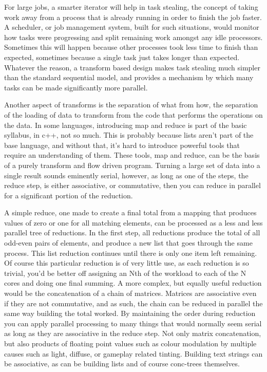 For large jobs, a smarter iterator will help in task stealing, the concept of
taking work away from a process that is already running in order to finish the
job faster. A scheduler, or job management system, built for such situations,
would monitor how tasks were progressing and split remaining work amongst any
idle processors. Sometimes this will happen because other processes took less
time to finish than expected, sometimes because a single task just takes longer
than expected. Whatever the reason, a transform based design makes task
stealing much simpler than the standard sequential model, and provides a
mechanism by which many tasks can be made significantly more parallel.

Another aspect of transforms is the separation of what from how, the separation
of the loading of data to transform from the code that performs the operations
on the data. In some languages, introducing map and reduce is part of the basic
syllabus, in c++, not so much. This is probably because lists aren't part of
the base language, and without that, it's hard to introduce powerful tools that
require an understanding of them. These tools, map and reduce, can be the basis
of a purely transform and flow driven program. Turning a large set of data into
a single result sounds eminently serial, however, as long as one of the steps,
the reduce step, is either associative, or commutative, then you can reduce in
parallel for a significant portion of the reduction.

A simple reduce, one made to create a final total from a mapping that produces
values of zero or one for all matching elements, can be processed as a less and
less parallel tree of reductions. In the first step, all reductions produce the
total of all odd-even pairs of elements, and produce a new list that goes
through the same process. This list reduction continues until there is only one
item left remaining. Of course this particular reduction is of very little use,
as each reduction is so trivial, you'd be better off assigning an Nth of the
workload to each of the N cores and doing one final summing. A more complex,
but equally useful reduction would be the concatenation of a chain of matrices.
Matrices are associative even if they are not commutative, and as such, the
chain can be reduced in parallel the same way building the total worked. By
maintaining the order during reduction you can apply parallel processing to
many things that would normally seem serial as long as they are associative in
the reduce step. Not only matrix concatenation, but also products of floating
point values such as colour modulation by multiple causes such as light,
diffuse, or gameplay related tinting. Building text strings can be associative,
as can be building lists and of course conc-trees themselves.
 
